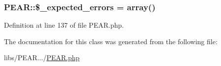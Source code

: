 \subsubsection[{\$\+\_\+expected\+\_\+errors}]{\setlength{\rightskip}{0pt plus 5cm}P\+E\+A\+R\+::\$\+\_\+expected\+\_\+errors = array()}\label{classPEAR_ae20c719eaa8316ed0bd6cc83eaa6d0ac}


Definition at line 137 of file P\+E\+A\+R.\+php.



The documentation for this class was generated from the following file\+:\begin{DoxyCompactItemize}
\item 
libs/\+P\+E\+A\+R.../\hyperlink{PEAR_8php}{P\+E\+A\+R.\+php}\end{DoxyCompactItemize}

